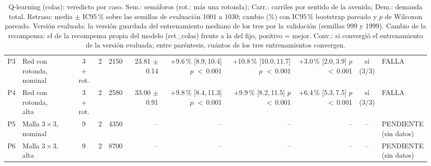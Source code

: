 \begin{table}[H]
\begin{tabular}{llcrrrrrrcl}
P3 & \makecell[l]{Red con\\{}rotonda,\\{}nominal} & \makecell[c]{3\\{}+ rot.} & 2 & 2150 & \makecell[r]{23.81\\{}$\pm$ 0.14} & \makecell[r]{+9.6\,\%\\{}[8.9,\,10.4]\\$p$ $<$\,0.001} & \makecell[r]{+10.8\,\%\\{}[10.0,\,11.7]\\$p$ $<$\,0.001} & \makecell[r]{+3.0\,\%\\{}[2.0,\,3.9]\\$p$ $<$\,0.001} & \makecell[c]{sí\\{}(3/3)} & FALLA \\
P4 & \makecell[l]{Red con\\{}rotonda,\\{}alta} & \makecell[c]{3\\{}+ rot.} & 2 & 2580 & \makecell[r]{33.00\\{}$\pm$ 0.91} & \makecell[r]{+9.8\,\%\\{}[8.4,\,11.3]\\$p$ $<$\,0.001} & \makecell[r]{+9.9\,\%\\{}[8.2,\,11.5]\\$p$ $<$\,0.001} & \makecell[r]{+6.4\,\%\\{}[5.3,\,7.5]\\$p$ $<$\,0.001} & \makecell[c]{sí\\{}(3/3)} & FALLA \\
P5 & \makecell[l]{Malla $3 \times 3$,\\{}nominal} & 9 & 2 & 4350 & -- & -- & -- & -- & -- & \makecell[l]{PENDIENTE\\{}(sin datos)} \\
P6 & \makecell[l]{Malla $3 \times 3$,\\{}alta} & 9 & 2 & 8700 & -- & -- & -- & -- & -- & \makecell[l]{PENDIENTE\\{}(sin datos)} \\
\bottomrule
\end{tabular}
\caption[Veredicto de Q-learning (colas)]{Q-learning (colas): veredicto por caso. Sem.: semáforos (rot.: más una rotonda); Carr.: carriles por sentido de la avenida; Dem.: demanda total. Retraso: media $\pm$ IC95\,\% sobre las semillas de evaluación 1001 a 1030; cambio (\%) con IC95\,\% bootstrap pareado y $p$ de Wilcoxon pareado. Versión evaluada: la versión guardada del entrenamiento mediano de los tres por la validación (semillas 999 y 1999). Cambio de la recompensa: el de la recompensa propia del modelo (ret\_colas) frente a la del fijo, positivo = mejor. Conv.: si convergió el entrenamiento de la versión evaluada; entre paréntesis, cuántos de los tres entrenamientos convergen.}
\label{tab:veredicto-ql-colas}
\end{table}
